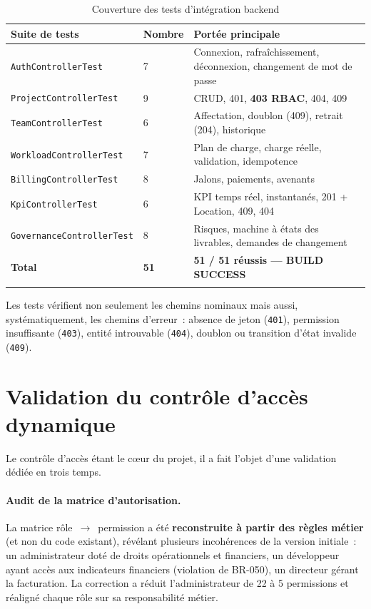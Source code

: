 \begin{longtable}{|m{5.2cm}|m{1.8cm}|m{6.4cm}|}
\hline
\textbf{Suite de tests} & \textbf{Nombre} & \textbf{Portée principale} \\
\hline
\endhead
\endfoot
\endlastfoot
\hline
\texttt{AuthControllerTest} & 7 & Connexion, rafraîchissement, déconnexion, changement de mot de passe \\
\hline
\texttt{ProjectControllerTest} & 9 & CRUD, 401, \textbf{403 RBAC}, 404, 409 \\
\hline
\texttt{TeamControllerTest} & 6 & Affectation, doublon (409), retrait (204), historique \\
\hline
\texttt{WorkloadControllerTest} & 7 & Plan de charge, charge réelle, validation, idempotence \\
\hline
\texttt{BillingControllerTest} & 8 & Jalons, paiements, avenants \\
\hline
\texttt{KpiControllerTest} & 6 & KPI temps réel, instantanés, 201 + Location, 409, 404 \\
\hline
\texttt{GovernanceControllerTest} & 8 & Risques, machine à états des livrables, demandes de changement \\
\hline
\textbf{Total} & \textbf{51} & \textbf{51 / 51 réussis --- BUILD SUCCESS} \\
\hline
\caption{Couverture des tests d'intégration backend}
\label{tab:tests}
\end{longtable}

\noindent Les tests vérifient non seulement les chemins nominaux mais aussi, systématiquement, les
chemins d'erreur~: absence de jeton (\texttt{401}), permission insuffisante (\texttt{403}), entité
introuvable (\texttt{404}), doublon ou transition d'état invalide (\texttt{409}).

\section{Validation du contrôle d'accès dynamique}

Le contrôle d'accès étant le c\oe ur du projet, il a fait l'objet d'une validation dédiée en trois
temps.

\paragraph{Audit de la matrice d'autorisation.} La matrice rôle~$\rightarrow$~permission a été
\textbf{reconstruite à partir des règles métier} (et non du code existant), révélant plusieurs
incohérences de la version initiale~: un administrateur doté de droits opérationnels et financiers,
un développeur ayant accès aux indicateurs financiers (violation de BR-050), un directeur gérant la
facturation. La correction a réduit l'administrateur de 22 à 5 permissions et réaligné chaque rôle
sur sa responsabilité métier.

